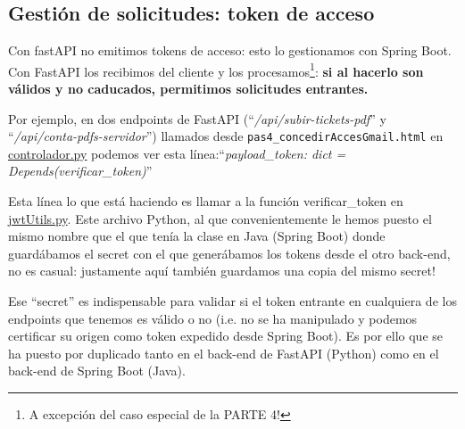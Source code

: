 \documentclass[a4paper,12pt]{report}
\begin{document}
		
	
	
	\subsection{Gestión de solicitudes: token de acceso}
	
	Con fastAPI no emitimos tokens de acceso: esto lo gestionamos con Spring Boot. Con FastAPI los recibimos del cliente y los procesamos\footnote{A excepción del caso especial de la PARTE 4!}: \textbf{si al hacerlo son válidos y no caducados, permitimos solicitudes entrantes.}
	
	Por ejemplo, en dos endpoints de FastAPI (``\textit{/api/subir-tickets-pdf}'' y ``\textit{/api/conta-pdfs-servidor}'') llamados desde \texttt{pas4\_concedirAccesGmail.html} en \href{https://github.com/blackcub3s/mercApp/blob/main/APP%20WEB/__FastAPI__/app/controlador.py}{controlador.py}  podemos ver esta línea:``\textit{payload\_token: dict = Depends(verificar\_token)}''
	 
	 Esta línea lo que está haciendo es llamar a la función verificar\_token en \href{https://github.com/blackcub3s/mercApp/blob/main/APP%20WEB/__FastAPI__/app/jwtUtil.py}{jwtUtils.py}. Este archivo Python, al que convenientemente le hemos puesto el mismo nombre que el que tenía la clase en Java (Spring Boot) donde guardábamos el secret con el que generábamos los tokens desde el otro back-end, no es casual: justamente aquí también guardamos una copia del mismo secret!
	
	Ese ``secret'' es indispensable para validar si el token entrante en cualquiera de los endpoints que tenemos es válido o no (i.e. no se ha manipulado y podemos certificar su origen como token expedido desde Spring Boot). Es por ello que se ha puesto por duplicado tanto en el back-end de FastAPI (Python) como en el back-end de Spring Boot (Java).
	
\end{document}
